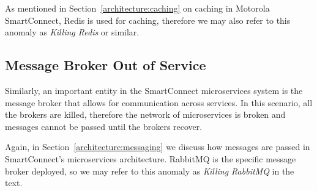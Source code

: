 As mentioned in Section~\ref{architecture:caching} on caching in Motorola SmartConnect, Redis is used for caching, therefore we may also refer to this anomaly as \textit{Killing Redis} or similar.


\subsection{Message Broker Out of Service}
Similarly, an important entity in the SmartConnect microservices system is the message broker that allows for communication across services. In this scenario, all the brokers are killed, therefore the network of microservices is broken and messages cannot be passed until the brokers recover.

Again, in Section~\ref{architecture:messaging} we discuss how messages are passed in SmartConnect's microservices architecture. RabbitMQ is the specific message broker deployed, so we may refer to this anomaly as \textit{Killing RabbitMQ} in the text.

